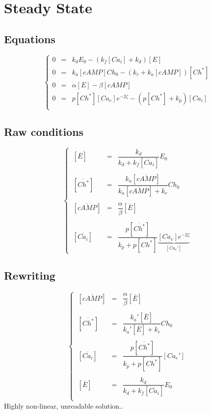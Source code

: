 \documentclass[aps,12pt]{revtex4}
\begin{document}
\section{Steady State}
\subsection{Equations}
\begin{equation}
\left\lbrace
\begin{array}{lcl}
0 & = & k_d E_0 - (k_f[Ca_i]+k_d)[E]\\
0 & = & k_a [cAMP] Ch_0 - (k_r+k_a[cAMP]) [Ch^\ast]\\
0  & = & \alpha [E] - \beta [cAMP]   \\
0  & = & p [Ch^\ast] [Ca_e] e^{-2\zeta}  - (p[Ch^\ast]+k_p) [Ca_i]  \\
\end{array}
\right.
\end{equation}

\subsection{Raw conditions}
\begin{equation}
\left\lbrace
\begin{array}{lcl}
~[\overline{E}] & = & \dfrac{k_d}{k_d+k_f[\overline{Ca_i}]} E_0\\
\\
~[ \overline{Ch^\ast} ] & = & \dfrac{k_a[\overline{cAMP}]}{k_a[\overline{cAMP}]+k_r} Ch_0\\
\\
~[\overline{cAMP}] & = & \dfrac{\alpha}{\beta}[\overline{E}] \\
\\
~[\overline{Ca_i}] & = & \dfrac{p[\overline{Ch^\ast}]}{k_p+p[\overline{Ch^\ast}]} \underbrace{[Ca_e] e^{-2\zeta}}_{[Ca_e']}
\end{array}
\right.
\end{equation}
	
\subsection{Rewriting}	
\begin{equation}
\left\lbrace
\begin{array}{lcl}
~[\overline{cAMP}] & = & \dfrac{\alpha}{\beta}[\overline{E}] \\
\\
~[ \overline{Ch^\ast} ] & = & \dfrac{k_a'[\overline{E}]}{k_a'[\overline{E}]+k_r} Ch_0\\
\\
~[\overline{Ca_i}] & = & \dfrac{p[\overline{Ch^\ast}]}{k_p+p[\overline{Ch^\ast}]} [Ca_e']\\
\\
~[\overline{E}] & = & \dfrac{k_d}{k_d+k_f[\overline{Ca_i}]} E_0\\
\end{array}
\right.
\end{equation}
Highly non-linear, unreadable solution..
\end{document}

